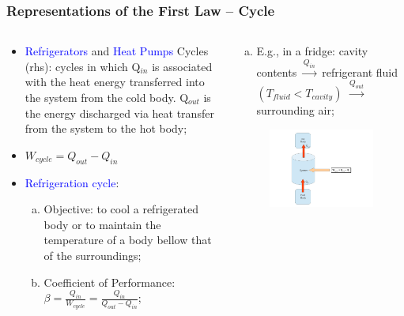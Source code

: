 \documentclass[10pt,compress]{beamer}
\begin{document}
\begin{frame}
 \frametitle{Representations of the First Law -- Cycle}
 \begin{columns}
  \begin{column}[l]{0.5\linewidth}
   \begin{itemize}%
    \item <1-> \textcolor{blue}{Refrigerators} and \textcolor{blue}{Heat Pumps} Cycles (rhs): cycles in which Q$_{in}$ is associated with the heat energy transferred into the system from the cold body. Q$_{out}$ is the energy discharged via heat transfer from the system to the hot body;
    \item <2-> $W_{cycle} = Q_{out} - Q_{in}$%
    \item <3-> \textcolor{blue}{Refrigeration cycle}:
     \begin{enumerate}[(a)]%
      \item <4-> Objective: to cool a refrigerated body or to maintain the temperature of a body bellow that of the surroundings;
      \item <5-> Coefficient of Performance: $\beta = \displaystyle\frac{Q_{in}}{W_{cycle}} = \displaystyle\frac{Q_{in}}{Q_{out} - Q_{in}}$;
     \end{enumerate}
    \end{itemize}
  \end{column}
   
  \begin{column}[c]{0.5\linewidth}
     \begin{enumerate}[(c)]%
      \item <6-> E.g., in a fridge: cavity contents $\xrightarrow{Q_{in}}$ refrigerant fluid $\left(T_{fluid} < T_{cavity}\right)$ $\xrightarrow{Q_{out}}$ surrounding air; 
     \end{enumerate}
\vspace{-.5cm}
   \begin{figure}%
    \begin{center}
     \includegraphics[width=8.cm,clip]{./Pics/FirstLaw_Cycle_02}
    \end{center}
   \end{figure}    
  \end{column}
 \end{columns}
 \normalsize
\end{frame}
\end{document}

